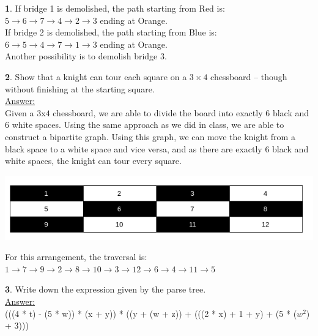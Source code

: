 \documentclass[12pt,a4paper]{article}
\theoremstyle{definition}
\newtheorem{problem}{}
\begin{document}
\begin{problem}
If bridge 1 is demolished, the path starting from Red is: \\

$5 \rightarrow 6 \rightarrow 7 \rightarrow 4 \rightarrow 2 \rightarrow 3$ ending at Orange. \\

If bridge 2 is demolished, the path starting from Blue is: \\

$6 \rightarrow 5 \rightarrow 4 \rightarrow 7 \rightarrow 1 \rightarrow 3$ ending at Orange. \\

Another possibility is to demolish bridge 3.

\end{problem}

\begin{problem}
Show that a knight can tour each square on a $3\times 4$ chessboard -- though without finishing at the starting square. \\

\underline{Answer:} \\
Given a $3$x$4$ chessboard, we are able to divide the board into exactly $6$ black and $6$ white spaces. Using the same approach as we did in class, we are able to construct a bipartite graph. Using this graph, we can move the knight from a black space to a white space and vice versa, and as there are exactly $6$ black and white spaces, the knight can tour every square. \\

\centerline{\includegraphics[scale=0.4]{chessboard.png}}
For this arrangement, the traversal is: \\

$1 \rightarrow 7 \rightarrow 9 \rightarrow 2 \rightarrow 8 \rightarrow 10 \rightarrow 3 \rightarrow 12 \rightarrow 6 \rightarrow 4 \rightarrow 11 \rightarrow 5$

\end{problem}

\begin{problem}
Write down the expression given by the parse tree.\\

\underline{Answer:} \\
(((4 * t) - (5 * w)) * (x + y)) * ((y + (w + z)) + (((2 * x) + 1 + y) + (5 * ($w^2$) + 3)))

\end{problem}
\end{document}
